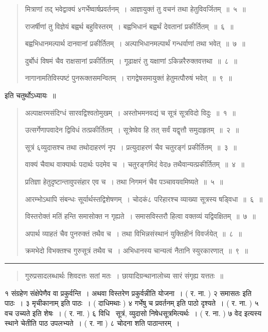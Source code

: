 \documentclass[11pt, openany]{book}
\begin{document}
\begin{quote}
{मित्राणां तद् भवेद्वाक्यं ४गर्भेष्वार्षप्रवर्तनम्~। आज्ञायुक्तं तु वचनं तथा हेतुविवर्जितम्~॥~५~॥

राजर्षीणां तु विज्ञेयं बह्वर्थ बहुविस्तरम्~। बह्वभिधानं बह्वर्थं देवतानां प्रकीर्तितम्~॥~६~॥

बह्वभिधानमल्पार्थ दानवानां प्रकीर्तितम्~। अल्पाभिधानमल्पार्थं गन्धर्वाणां तथा भवेत्~॥~७~॥

दुर्बोधं विषमं चैव राक्षसानां प्रकीर्तितम्~। गूढाक्षरं तु यक्षाणां ऽकिन्नरैरुक्तवत्तथा~॥~८~॥

नागानामतिविस्पष्टं पुनरूक्तसमन्वितम्~। रागद्वेषसमायुक्तं हेतुमत्पौरुषं भवेत्~॥~९~॥}
\end{quote}

\vspace{-7mm}
\begin{flushright}
इति चतुर्थोऽध्यायः~॥ 
\end{flushright}

\begin{quote}
{\mbh अल्पाक्षरमसंदिग्धं सारवद्विश्वतोमुखम्~। अस्तोभमनवद्यं च सूत्रं सूत्रविदो विदुः~॥~१~॥

उत्सर्गेणापवादेन द्विविधं तत्प्रकीर्तितम्~। सूत्रेष्वेव हि तत् सर्वं यद्वृत्तौ समुदाहृतम्~॥~२~॥

सूत्रं ६व्युदासश्च तथा तथोदाहरणं नृप~। प्रत्युदाहरणं चैव चतुरङ्गं प्रकीर्तितम्~॥~३~॥

वाक्यं चैवाथ वाक्यार्थः पदार्थः पदमेव च~। चतुरङ्गमिदं वेद७ तथैवान्यत्प्रकीर्तितम्~॥~४~॥

प्रतिज्ञा हेतुदृष्टान्तावुपसंहार एव च~। तथा निगमनं चैव पञ्चावयवमिष्यते~॥~५~॥ 

आरम्भोऽथापि संबन्धः सूर्यार्थस्तद्विशेषणम्~। चोदकं८ परिहारश्च व्याख्या सूत्रस्य षड्विधा~॥~६~॥

विस्तरोक्तं मतिं हन्ति समासोक्त न गृह्यते~। समासविस्तरौ हित्वा वक्तव्यं यद्विवक्षितम्~॥~७~॥

अपार्थ व्याहतं चैव पुनरुक्तं तथैव च~। तथा विभिन्नसंस्थानं युक्तिहीनं विवर्जयेत्~॥~८~॥

क्रमभेदो विभक्तश्च गुरुसूत्रं तथैव च~। अभिधानस्य चान्यत्वं नैतानि स्युरकारणात्~॥~९~॥}
\end{quote}

\noindent
\rule{1\linewidth}{0.5pt}

\begin{quote}
{\qt गुरुप्रसादलब्धार्थः शिवदत्तः सतां मतः~। छायादिग्रन्थानालोच्य सारं संगृह्य यत्ततः~॥}
\end{quote}

१ संग्रहेण संक्षेपेणैव वा प्रकुर्वन्ति~। अथवा विस्तरेण प्रकुर्वन्नीति योजना~। ( र. ना. ) २ {\qt समासतः} इति पाठः~। ३ {\qt मृचीकानाम्} इति पाठः~। ( दाधिमथाः ) ४ {\qt गर्भेषु च प्रवर्तनम्} इति पाठो दृश्यते~। ( र. ना. ) ५ वच उच्यते इति शेषः~। ( र. ना. ) ६ विधि \textendash\ सूत्रं, व्युदासो निषेधसूत्रमित्यर्थः~। ( र. ना. ) ७ वेद इत्यस्य स्थाने चेतीति पाठ उपलभ्यते~। ( र. ना ) ८ {\qt चोदना} शति पाठान्तरम्~। 
\end{document}
